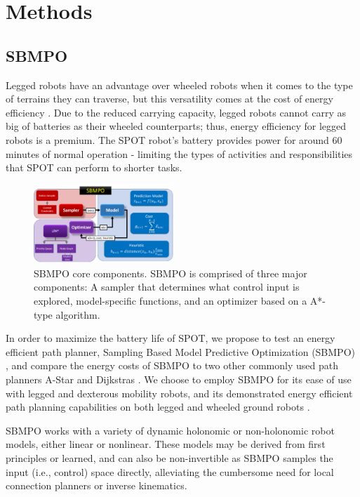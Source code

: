 \documentclass[conference]{IEEEtran}
\begin{document}
\section{Methods}
    \subsection{SBMPO}
        Legged robots have an advantage over wheeled robots when it comes to the type of terrains they can traverse, but this versatility comes at the cost of energy efficiency \cite{leggedRobots, silva2012literature, aau5872, mario}. Due to the reduced carrying capacity, legged robots cannot carry as big of batteries as their wheeled counterparts; thus, energy efficiency for legged robots is a premium. The SPOT robot's battery provides power for around 60 minutes of normal operation - limiting the types of activities and responsibilities that SPOT can perform to shorter tasks.
        
       \begin{figure}[h]
           \centering
           \includegraphics[width=0.47\textwidth]{SBMPO}
            \caption{SBMPO core components. SBMPO is comprised of three major components: A sampler that determines what control input is explored, model-specific functions, and an optimizer based on a A*-type algorithm.}
            \label{fig:SBMPO}
        \end{figure} 
        
        In order to maximize the battery life of SPOT, we propose to test an energy efficient path planner, Sampling Based Model Predictive Optimization (SBMPO) \cite{mario}, and compare the energy costs of SBMPO to two other commonly used path planners A-Star and Dijkstras \cite{duchovn2014path, wang2011application}. We choose to employ SBMPO for its ease of use with legged and dexterous mobility robots, and its demonstrated energy efficient path planning capabilities on both legged and wheeled ground robots \cite{mario}.  
        
        SBMPO works with a variety of dynamic holonomic or non-holonomic robot models, either linear or nonlinear. These models may be derived from first principles or learned, and can also be non-invertible as SBMPO samples the input (i.e., control) space directly, alleviating the cumbersome need for local connection planners or inverse kinematics. 
\end{document}

